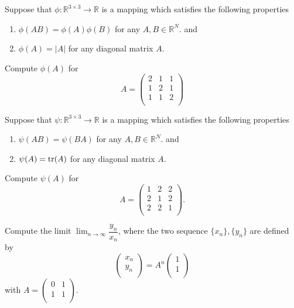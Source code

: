 \begin{problem} Suppose that $\phi:\mathbb{R}^{3\times 3}\to \mathbb{R}$ is a mapping which satisfies the following properties
\begin{enumerate}
  \item $\phi(AB)=\phi(A)\phi(B)$ for any $A,B\in \mathbb{R}^N.$ and
  \item $\phi(A)=|A|$ for any diagonal matrix $A.$
\end{enumerate}
Compute $\phi(A)$ for
\[A=\left(
      \begin{array}{ccc}
        2 & 1 & 1 \\
        1 & 2 &1 \\
        1 & 1 & 2 \\
      \end{array}
    \right)
\]
\end{problem}

\begin{problem} Suppose that $\psi:\mathbb{R}^{3\times 3}\to \mathbb{R}$ is a mapping which satisfies the following properties
\begin{enumerate}
  \item $\psi(AB)=\psi(BA)$ for any $A,B\in \mathbb{R}^N.$ and
  \item $\psi(A)={\rm tr}(A)$ for any diagonal matrix $A.$
\end{enumerate}
Compute $\psi(A)$ for
\[A=\left(
      \begin{array}{ccc}
        1 & 2 & 2 \\
        2 & 1 &2 \\
        2 &2 & 1 \\
      \end{array}
    \right).
\]
\end{problem}

\begin{problem} Compute the limit $\displaystyle \lim_{n\to \infty}\dfrac{y_n}{x_n}$, where the two sequence $\{x_n\}, \{y_n\}$ are defined by 
\[ \left(
    \begin{array}{c}
      x_n \\
      y_n \\
    \end{array}
  \right)=A^n\left(
    \begin{array}{c}
      1 \\
      1 \\
    \end{array}
  \right)
\] with  $A=\left(
                  \begin{array}{cc}
                    0 & 1 \\
                    1 & 1 \\
                  \end{array}
                \right)
$.  
\end{problem}

